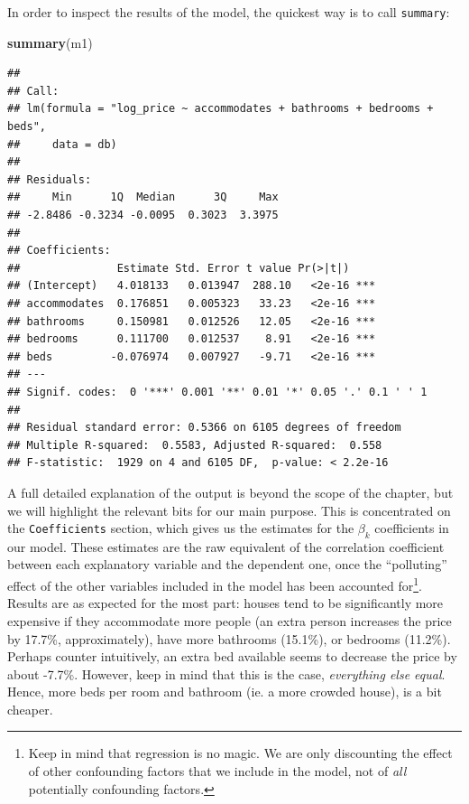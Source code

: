 \documentclass[
]{book}
\newenvironment{Shaded}{\begin{snugshade}}{\end{snugshade}}
\newcommand{\KeywordTok}[1]{\textcolor[rgb]{0.13,0.29,0.53}{\textbf{#1}}}
\newcommand{\NormalTok}[1]{#1}
\begin{document}
In order to inspect the results of the model, the quickest way is to call \texttt{summary}:

\begin{Shaded}
\begin{Highlighting}[]
\KeywordTok{summary}\NormalTok{(m1)}
\end{Highlighting}
\end{Shaded}

\begin{verbatim}
## 
## Call:
## lm(formula = "log_price ~ accommodates + bathrooms + bedrooms + beds", 
##     data = db)
## 
## Residuals:
##     Min      1Q  Median      3Q     Max 
## -2.8486 -0.3234 -0.0095  0.3023  3.3975 
## 
## Coefficients:
##               Estimate Std. Error t value Pr(>|t|)    
## (Intercept)   4.018133   0.013947  288.10   <2e-16 ***
## accommodates  0.176851   0.005323   33.23   <2e-16 ***
## bathrooms     0.150981   0.012526   12.05   <2e-16 ***
## bedrooms      0.111700   0.012537    8.91   <2e-16 ***
## beds         -0.076974   0.007927   -9.71   <2e-16 ***
## ---
## Signif. codes:  0 '***' 0.001 '**' 0.01 '*' 0.05 '.' 0.1 ' ' 1
## 
## Residual standard error: 0.5366 on 6105 degrees of freedom
## Multiple R-squared:  0.5583, Adjusted R-squared:  0.558 
## F-statistic:  1929 on 4 and 6105 DF,  p-value: < 2.2e-16
\end{verbatim}

A full detailed explanation of the output is beyond the scope of the chapter, but we will highlight the relevant bits for our main purpose. This is concentrated on the \texttt{Coefficients} section, which gives us the estimates for the \(\beta_k\) coefficients in our model. These estimates are the raw equivalent of the correlation coefficient between each explanatory variable and the dependent one, once the ``polluting'' effect of the other variables included in the model has been accounted for\footnote{Keep in mind that regression is no magic. We are only discounting the effect of other confounding factors that we include in the model, not of \emph{all} potentially confounding factors.}. Results are as expected for the most part: houses tend to be significantly more expensive if they accommodate more people (an extra person increases the price by 17.7\%, approximately), have more bathrooms (15.1\%), or bedrooms (11.2\%). Perhaps counter intuitively, an extra bed available seems to decrease the price by about -7.7\%. However, keep in mind that this is the case, \emph{everything else equal}. Hence, more beds per room and bathroom (ie. a more crowded house), is a bit cheaper.
\end{document}
